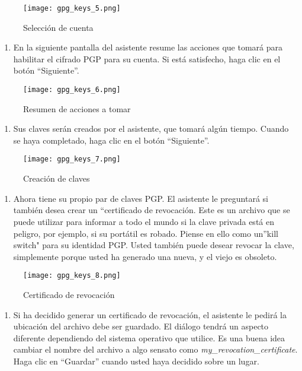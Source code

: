 \documentclass[10pt,a5paper,twoside,,]{book}
\providecommand{\tightlist}{%
  \setlength{\itemsep}{0pt}\setlength{\parskip}{0pt}}
\begin{document}
\begin{figure}[htbp]
\centering
\texttt{[image: gpg\_keys\_5.png]}
\caption{Selección de cuenta}
\end{figure}

\begin{enumerate}
\def\labelenumi{\arabic{enumi}.}
\setcounter{enumi}{5}
\tightlist
\item
  En la siguiente pantalla del asistente resume las acciones que tomará
  para habilitar el cifrado PGP para su cuenta. Si está satisfecho, haga
  clic en el botón ``Siguiente''.
\end{enumerate}

\begin{figure}[htbp]
\centering
\texttt{[image: gpg\_keys\_6.png]}
\caption{Resumen de acciones a tomar}
\end{figure}

\begin{enumerate}
\def\labelenumi{\arabic{enumi}.}
\setcounter{enumi}{6}
\tightlist
\item
  Sus claves serán creados por el asistente, que tomará algún tiempo.
  Cuando se haya completado, haga clic en el botón ``Siguiente''.
\end{enumerate}

\begin{figure}[htbp]
\centering
\texttt{[image: gpg\_keys\_7.png]}
\caption{Creación de claves}
\end{figure}

\begin{enumerate}
\def\labelenumi{\arabic{enumi}.}
\setcounter{enumi}{7}
\tightlist
\item
  Ahora tiene su propio par de claves PGP. El asistente le preguntará si
  también desea crear un ``certificado de revocación. Este es un archivo
  que se puede utilizar para informar a todo el mundo si la clave
  privada está en peligro, por ejemplo, si su portátil es robado. Piense
  en ello como un''kill switch" para su identidad PGP. Usted también
  puede desear revocar la clave, simplemente porque usted ha generado
  una nueva, y el viejo es obsoleto.
\end{enumerate}

\begin{figure}[htbp]
\centering
\texttt{[image: gpg\_keys\_8.png]}
\caption{Certificado de revocación}
\end{figure}

\begin{enumerate}
\def\labelenumi{\arabic{enumi}.}
\setcounter{enumi}{8}
\tightlist
\item
  Si ha decidido generar un certificado de revocación, el asistente le
  pedirá la ubicación del archivo debe ser guardado. El diálogo tendrá
  un aspecto diferente dependiendo del sistema operativo que utilice. Es
  una buena idea cambiar el nombre del archivo a algo sensato como
  \emph{my\_revocation\_certificate}. Haga clic en ``Guardar'' cuando
  usted haya decidido sobre un lugar.
\end{enumerate}
\end{document}

